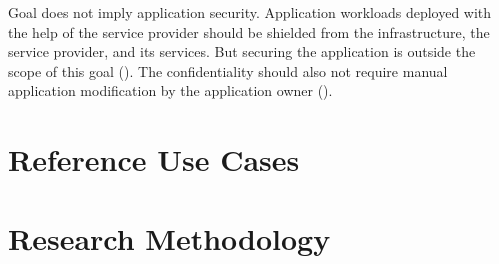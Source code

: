 Goal  does not imply application security. Application workloads
deployed with the help of the service provider should be shielded from the
infrastructure, the service provider, and its services. But securing the
application is outside the scope of this goal (). The
confidentiality should also not require manual application modification by the
application owner ().

\section{Reference Use Cases}

\section{Research Methodology}
\label{sec:research-methodology}
